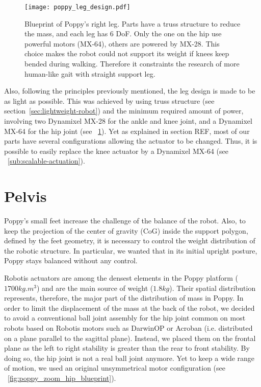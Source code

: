 \begin{figure}[p]
    \centering
        \texttt{[image: poppy\_leg\_design.pdf]}
    \caption{Blueprint of Poppy's right leg. Parts have a truss structure to reduce the mass, and each leg has 6 DoF. Only the one on the hip use powerful motors (MX-64), others are powered by MX-28. This choice makes the robot could not support its weight if knees keep bended during walking. Therefore it constraints the research of more human-like gait with straight support leg.}
    \label{fig:poppy_leg_design}
\end{figure}


Also, following the principles previously mentioned, the leg design is made to be as light as possible. This was achieved by using truss structure (see section~\ref{sec:lightweight-robot}) and the minimum required amount of power, involving two Dynamixel MX-28 for the ankle and knee joint, and a Dynamixel MX-64 for the hip joint (see \figurename~\ref{fig:poppy_leg_design}). Yet as explained in section REF, most of our parts have several configurations allowing the actuator to be changed. Thus, it is possible to easily replace the knee actuator by a Dynamixel MX-64 (see \figurename~\ref{sub:scalable-actuation}).


\section{Pelvis} %
\label{sec:hip}


Poppy's small feet increase the challenge of the balance of the robot. Also, to keep the projection of the center of gravity (CoG) inside the support polygon, defined by the feet geometry, it is necessary to control the weight distribution of the robotic structure. In particular, we wanted that in its initial upright posture, Poppy stays balanced without any control.

Robotis actuators are among the densest elements in the Poppy platform ($ 1700 kg.m^{3} $) and are the main source of weight ($1.8 kg$). Their spatial distribution represents, therefore, the major part of the distribution of mass in Poppy. In order to limit the displacement of the mass at the back of the robot, we decided to avoid a conventional ball joint assembly for the hip joint common on most robots based on Robotis motors such as DarwinOP or Acroban (i.e. distributed on a plane parallel to the sagittal plane). Instead, we placed them on the frontal plane as the left to right stability is greater than the rear to front stability. By doing so, the hip joint is not a real ball joint anymore. Yet to keep a wide range of motion, we used an original unsymmetrical motor configuration (see \figurename~\ref{fig:poppy_zoom_hip_blueprint}).

